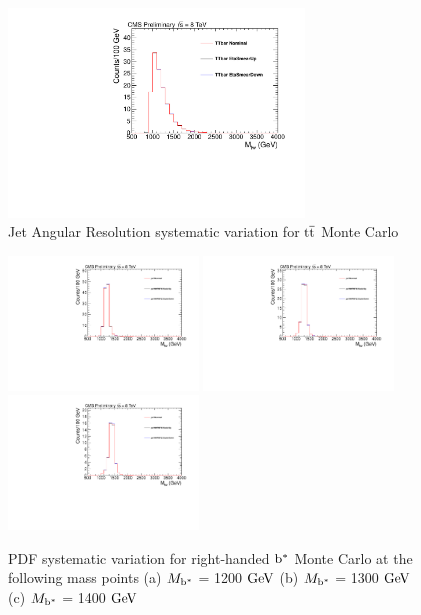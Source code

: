 \begin{figure}[htcb]
\begin{center}
\includegraphics[width=0.7\textwidth]{AN-14-049/figs/TTbar_EtaScaling}
\caption{Jet Angular Resolution systematic variation for $\mathrm{t\overline{t}}$ Monte Carlo}
\label{figs:bsttbarJAR}
\end{center}
\end{figure}

\begin{figure}[htcb]
\begin{center}
\includegraphics[width=0.45\textwidth]{AN-14-049/figs/Signal_M1200_PdfScaleNNPDF23.pdf}
\includegraphics[width=0.45\textwidth]{AN-14-049/figs/Signal_M1300_PdfScaleNNPDF23.pdf}
\includegraphics[width=0.45\textwidth]{AN-14-049/figs/Signal_M1400_PdfScaleNNPDF23.pdf}
\caption{
PDF systematic variation for right-handed $\mathrm{b}^{*}$  Monte Carlo at the following mass points
(a) $M_{\mathrm{b}^{*}}$ = 1200$~\mathrm{GeV}$ 
(b) $M_{\mathrm{b}^{*}}$ = 1300$~\mathrm{GeV}$
(c) $M_{\mathrm{b}^{*}}$ = 1400$~\mathrm{GeV}$ 
}
\label{figs:bssignalPDF}
\end{center}
\end{figure}

